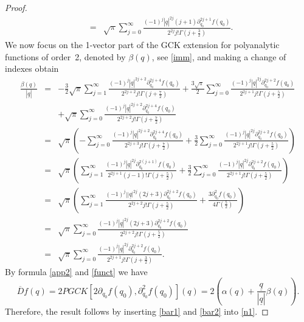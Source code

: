 \documentclass[reqno,11pt]{amsart}
\numberwithin{equation}{section}
\theoremstyle{definition}
\begin{document}
\begin{proof}
\begin{eqnarray}
		\label{bar1}
		&=& \sqrt{\pi}\sum_{j=0}^\infty \frac{(-1)^j | \underline{q}|^{2j} (j+1) \partial_{q_0}^{2j+1}f(q_0)}{2^{2j}j! \Gamma \left(j+\frac{3}{2}\right)}.
	\end{eqnarray}
	\endgroup
	We now focus on the 1-vector part of the GCK extension for polyanalytic functions of order~2, denoted by $\beta(q)$, see \eqref{imm}, and making a change of indexes obtain
			\begingroup\allowdisplaybreaks
	\begin{eqnarray}
		\nonumber
		\frac{\beta(q)}{|\underline{q}|}&=&- \frac{3}{2} \sqrt{\pi} \sum_{j=1}^\infty \frac{(-1)^j | \underline{q}|^{2j+2} \partial_{q_0}^{2j+4} f(q_0)}{2^{2j+2} j! \Gamma \left(j+\frac{7}{2}\right)}+ \frac{3 \sqrt{\pi}}{2} \sum_{j=0}^\infty \frac{(-1)^j | \underline{q}|^{2j} \partial_{q_0}^{2j+2} f(q_0)}{2^{2j+1}j! \Gamma \left(j+\frac{5}{2}\right)}\\
		\nonumber
		&&+ \sqrt{\pi} \sum_{j=0}^\infty \frac{(-1)^j |\underline{q}|^{2j+2} \partial_{q_0}^{2j+4}f(q_0)}{2^{2j+2}j! \Gamma \left(j+\frac{7}{2}\right)}\\
		\nonumber
		&=& \sqrt{ \pi} \left(- \sum_{j=0}^\infty \frac{(-1)^j | \underline{q}|^{2j+2} \partial_{q_0}^{2j+4}f(q_0)}{2^{2j+3} j! \Gamma \left(j+\frac{7}{2}\right)}+ \frac{3 }{2} \sum_{j=0}^\infty \frac{(-1)^j | \underline{q}|^{2j} \partial_{q_0}^{2j+2} f(q_0)}{2^{2j+1}j! \Gamma \left(j+\frac{5}{2}\right)}\right)\\
		\nonumber
		&=& \sqrt{\pi} \left(\sum_{j=1}^\infty \frac{(-1)^j | \underline{q}|^{2j} \partial_{q_0}^{2(j+1)}f(q_0)}{2^{2j+1}(j-1)! \Gamma \left(j+\frac{5}{2}\right)}+\frac{3 }{2} \sum_{j=0}^\infty \frac{(-1)^j | \underline{q}|^{2j} \partial_{q_0}^{2j+2} f(q_0)}{2^{2j+1}j! \Gamma \left(j+\frac{5}{2}\right)}\right)\\
		\nonumber
		&=& \sqrt{\pi}\left(\sum_{j=1}^\infty \frac{(-1)^j | |\underline{q}|^{2j} (2j+3) \partial_{q_0}^{2j+2}f(q_0)}{2^{2j+2} j! \Gamma \left(j+\frac{5}{2}\right)}+ \frac{3 \partial_{q_0}^2 f(q_0)}{4 \Gamma \left(\frac{5}{2}\right)}\right)\\
		\nonumber
		&=&\sqrt{\pi}\sum_{j=0}^\infty \frac{(-1)^j  |\underline{q}|^{2j} (2j+3) \partial_{q_0}^{2j+2}f(q_0)}{2^{2j+2} j! \Gamma \left(j+\frac{5}{2}\right)}\\
		\label{bar2}
		&=& \sqrt{\pi}\sum_{j=0}^\infty \frac{(-1)^j  |\underline{q}|^{2j}  \partial_{q_0}^{2j+2}f(q_0)}{2^{2j+1} j! \Gamma \left(j+\frac{3}{2}\right)}.
	\end{eqnarray}
	\endgroup
By formula \eqref{app2} and \eqref{funct} we have
\begin{equation}
\label{n1}
\overline{D} f(q)=2PGCK[2\partial_{q_0}f(q_0), \partial_{q_0}^2 f(q_0)](q) = 2\left (\alpha(q)+ \frac{\underline{q}}{|\underline{q}|} \beta(q)\right).
\end{equation}	
Therefore, the result follows by inserting \eqref{bar1} and \eqref{bar2} into \eqref{n1}.
\end{proof}
\end{document}
